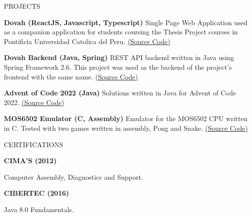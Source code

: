 \documentclass{resume} %
\begin{document}
    \begin{rSection}{PROJECTS}
        \vspace{-1.25em}
        \item \textbf{Dovah (ReactJS, Javascript, Typescript)} 
            {Single Page Web Application used as a companion application for 
            students coursing the Thesis Project courses in Pontificia 
            Universidad Catolica del Peru.
            \href{https://github.com/PUCP-INF/Dovah-Frontend}{(Source Code)}}
        \item \textbf{Dovah Backend (Java, Spring)} 
            {REST API backend written in Java using Spring Framework 2.6. 
            This project was used as the backend of the project's frontend with the 
            same name.
            \href{https://github.com/PUCP-INF/Dovah-Backend}{(Source Code)}}
        \item \textbf{Advent of Code 2022 (Java)}
            {Solutions written in Java for Advent of Code 2022.
            \href{https://github.com/csantv/AdventOfCode2022}{(Source Code)}}
        \item \textbf{MOS6502 Emulator (C, Assembly)} 
            {Emulator for the MOS6502 CPU written in C. Tested with two games 
            written in assembly, Pong and Snake. 
            \href{https://github.com/csantv/mos6502-emulator} {(Source Code)}}
    \end{rSection}

    \begin{rSection}{CERTIFICATIONS}
        \vspace{-1.25em}
        \item \textbf{CIMA'S (2012)}
        \item {Computer Assembly, Diagnostics and Support.}
        \item \textbf{CIBERTEC (2016)}
        \item {Java 8.0 Fundamentals.}
    \end{rSection}
\end{document}
